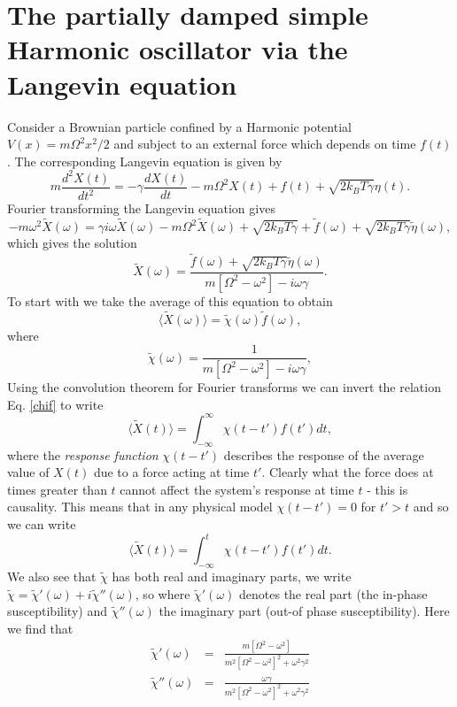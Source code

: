 \documentclass[11pt]{report}
\begin{document}
 \section{The partially damped simple Harmonic oscillator via the Langevin equation}
 Consider a Brownian particle confined by a Harmonic potential $V(x) = m\Omega^2 x^2/2$ and subject to an external force which depends on time $f(t)$. The corresponding Langevin equation is given by
 \begin{equation}
 m\frac{d^2X(t)}{dt^2} = -\gamma \frac{dX(t)}{dt} -m\Omega^2 X(t)  + f(t)+\sqrt{2k_BT\gamma}\eta(t).
 \end{equation}
 Fourier transforming the Langevin equation gives
 \begin{equation}
 -m\omega^2 \tilde X(\omega) = \gamma i\omega \tilde X(\omega) - m\Omega^2 \tilde X(\omega) +\sqrt{2k_BT\gamma} + \tilde f(\omega)+\sqrt{2k_BT\gamma}\tilde\eta(\omega), 
 \end{equation}
 which gives the solution
 \begin{equation}
 \tilde X(\omega) = \frac{\tilde f(\omega)+\sqrt{2k_BT\gamma}\tilde\eta(\omega)}{m[\Omega^2-\omega^2] - i\omega\gamma}.
 \end{equation}
 To start with we take the average of this equation to obtain
 \begin{equation}
 \langle \tilde X(\omega)\rangle = \tilde\chi(\omega)\tilde f(\omega),\label{chif}
 \end{equation}
 where 
 \begin{equation}
 \tilde\chi(\omega) = \frac{1}{m[\Omega^2-\omega^2] - i\omega\gamma},
 \end{equation}
 Using the convolution theorem for Fourier transforms we can invert the relation Eq. \eqref{chif} to write 
 \begin{equation}
 \langle\tilde X(t)\rangle = \int_{-\infty}^\infty \chi(t-t')f(t')dt,
 \end{equation}
 where the {\em response function} $\chi(t-t')$ describes the response of the average value of $X(t)$ due to a force acting at time $t'$. Clearly what the force does at times greater than $t$ cannot affect the system's response at time $t$ - this is causality. This means that in any physical model $\chi(t-t')
 =0$ for $t'>t$ and so we can write
 \begin{equation}
 \langle\tilde X(t)\rangle = \int_{-\infty}^t \chi(t-t')f(t')dt.
 \end{equation}
 We also see that $\tilde \chi$ has both real and imaginary parts, we write
 $\tilde \chi = \tilde \chi'(\omega) + i\tilde \chi''(\omega)$, so where $\tilde \chi'(\omega)$ denotes the real part (the in-phase susceptibility) and $\tilde \chi''(\omega)$ the imaginary part (out-of phase susceptibility). Here we find that
 \begin{eqnarray}
 \tilde \chi'(\omega)&=& \frac{m[\Omega^2-\omega^2]}{m^2[\Omega^2-\omega^2]^2+\omega^2\gamma^2}\\
 \tilde \chi''(\omega) &=& \frac{\omega\gamma}{m^2[\Omega^2-\omega^2]^2+\omega^2\gamma^2}\label{chipp}
 \end{eqnarray}
\end{document}
